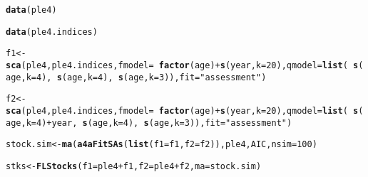 \documentclass[a4paper,english,10pt]{article}\usepackage[]{graphicx}\usepackage[]{color}
\makeatletter
\newcommand{\hlnum}[1]{\textcolor[rgb]{0.686,0.059,0.569}{#1}}%
\newcommand{\hlstr}[1]{\textcolor[rgb]{0.192,0.494,0.8}{#1}}%
\newcommand{\hlopt}[1]{\textcolor[rgb]{0,0,0}{#1}}%
\newcommand{\hlstd}[1]{\textcolor[rgb]{0.345,0.345,0.345}{#1}}%
\newcommand{\hlkwb}[1]{\textcolor[rgb]{0.69,0.353,0.396}{#1}}%
\newcommand{\hlkwc}[1]{\textcolor[rgb]{0.333,0.667,0.333}{#1}}%
\newcommand{\hlkwd}[1]{\textcolor[rgb]{0.737,0.353,0.396}{\textbf{#1}}}%
\newenvironment{kframe}{%
 \def\at@end@of@kframe{}%
 \ifinner\ifhmode%
  \def\at@end@of@kframe{\end{minipage}}%
  \begin{minipage}{\columnwidth}%
 \fi\fi%
 \def\FrameCommand##1{\hskip\@totalleftmargin \hskip-\fboxsep
 \colorbox{shadecolor}{##1}\hskip-\fboxsep
     \hskip-\linewidth \hskip-\@totalleftmargin \hskip\columnwidth}%
 \MakeFramed {\advance\hsize-\width
   \@totalleftmargin\z@ \linewidth\hsize
   \@setminipage}}%
 {\par\unskip\endMakeFramed%
 \at@end@of@kframe}
\newenvironment{knitrout}{}{} %
\makeatother
\begin{document}
\begin{knitrout}
\color{fgcolor}\begin{kframe}
\begin{alltt}
\hlkwd{data}\hlstd{(ple4)}
\end{alltt}


{\ttfamily\noindent\color{warningcolor}{\#\# Warning: data set 'ple4' not found}}\begin{alltt}
\hlkwd{data}\hlstd{(ple4.indices)}
\end{alltt}


{\ttfamily\noindent\color{warningcolor}{\#\# Warning: data set 'ple4.indices' not found}}\begin{alltt}
\hlstd{f1} \hlkwb{<-} \hlkwd{sca}\hlstd{(ple4, ple4.indices,} \hlkwc{fmodel}\hlstd{=}\hlopt{~} \hlkwd{factor}\hlstd{(age)} \hlopt{+} \hlkwd{s}\hlstd{(year,} \hlkwc{k}\hlstd{=}\hlnum{20}\hlstd{),} \hlkwc{qmodel}\hlstd{=}\hlkwd{list}\hlstd{(}\hlopt{~} \hlkwd{s}\hlstd{(age,} \hlkwc{k} \hlstd{=} \hlnum{4}\hlstd{),} \hlopt{~} \hlkwd{s}\hlstd{(age,} \hlkwc{k} \hlstd{=} \hlnum{4}\hlstd{),} \hlopt{~} \hlkwd{s}\hlstd{(age,} \hlkwc{k} \hlstd{=} \hlnum{3}\hlstd{)),} \hlkwc{fit} \hlstd{=} \hlstr{"assessment"}\hlstd{)}
\end{alltt}


{\ttfamily\noindent\bfseries{}}\begin{alltt}
\hlstd{f2} \hlkwb{<-} \hlkwd{sca}\hlstd{(ple4, ple4.indices,} \hlkwc{fmodel}\hlstd{=}\hlopt{~} \hlkwd{factor}\hlstd{(age)} \hlopt{+} \hlkwd{s}\hlstd{(year,} \hlkwc{k}\hlstd{=}\hlnum{20}\hlstd{),} \hlkwc{qmodel}\hlstd{=}\hlkwd{list}\hlstd{(}\hlopt{~} \hlkwd{s}\hlstd{(age,} \hlkwc{k} \hlstd{=} \hlnum{4}\hlstd{)}\hlopt{+}\hlstd{year,} \hlopt{~} \hlkwd{s}\hlstd{(age,} \hlkwc{k} \hlstd{=} \hlnum{4}\hlstd{),} \hlopt{~} \hlkwd{s}\hlstd{(age,} \hlkwc{k} \hlstd{=} \hlnum{3}\hlstd{)),} \hlkwc{fit} \hlstd{=} \hlstr{"assessment"}\hlstd{)}
\end{alltt}


{\ttfamily\noindent\bfseries{}}\begin{alltt}
\hlstd{stock.sim} \hlkwb{<-} \hlkwd{ma}\hlstd{(}\hlkwd{a4aFitSAs}\hlstd{(}\hlkwd{list}\hlstd{(}\hlkwc{f1}\hlstd{=f1,} \hlkwc{f2}\hlstd{=f2)), ple4, AIC,} \hlkwc{nsim} \hlstd{=} \hlnum{100}\hlstd{)}
\end{alltt}


{\ttfamily\noindent\bfseries{}}\begin{alltt}
\hlstd{stks} \hlkwb{<-} \hlkwd{FLStocks}\hlstd{(}\hlkwc{f1}\hlstd{=ple4}\hlopt{+}\hlstd{f1,} \hlkwc{f2}\hlstd{=ple4}\hlopt{+}\hlstd{f2,} \hlkwc{ma}\hlstd{=stock.sim)}
\end{alltt}


{\ttfamily\noindent\bfseries{}}\end{kframe}
\end{knitrout}
\end{document}
